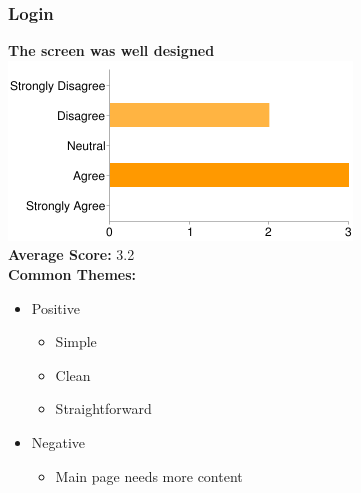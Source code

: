 \subsubsection{Login}
\textbf{The screen was well designed}\\
\includegraphics[page=1,scale=0.65]{../other/usability-report-charts/login_bar_chart}\\
\textbf{Average Score:} 3.2\\
\textbf{Common Themes:}
\begin{itemize}
\item Positive
\begin{itemize}
\item Simple
\item Clean
\item Straightforward
\end{itemize}
\item Negative
\begin{itemize}
\item Main page needs more content
\end{itemize}
\end{itemize}


